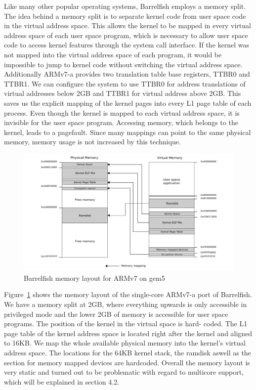\documentclass[a4paper,twoside]{report} %
\begin{document}
Like many other popular operating systems, Barrelfish employs a memory
split. The idea behind a memory split is to separate kernel code from
user space code in the virtual address space. This allows the kernel
to be mapped in every virtual address space of each user space
program, which is necessary to allow user space code to access kernel
features through the system call interface. If the kernel was not
mapped into the virtual address space of each program, it would be
impossible to jump to kernel code without switching the virtual
address space. Additionally ARMv7-a provides two translation table
base registers, TTBR0 and TTBR1. We can configure the system to use
TTBR0 for address translations of virtual addresses below 2GB and
TTBR1 for virtual address above 2GB. This saves us the explicit
mapping of the kernel pages into every L1 page table of each process.
Even though the kernel is mapped to each virtual address space, it is
invisible for the user space program. Accessing memory, which belongs
to the kernel, leads to a pagefault. Since many mappings can point to
the same physical memory, memory usage is not increased by this
technique.

\begin{figure}[htb]
  \centering
  \includegraphics[width=\linewidth]{figures/memory_layout.png}
  \caption{Barrelfish memory layout for ARMv7 on gem5}
  \label{fig:memory_layout}
\end{figure}

Figure~\ref{fig:memory_layout} shows the memory layout of the
single-core ARMv7-a port of Barrelfish. We have a memory split at 2GB,
where everything upwards is only accessible in privileged mode and the
lower 2GB of memory is accessible for user space programs. The
position of the kernel in the virtual space is hard- coded. The L1
page table of the kernel address space is located right after the
kernel and aligned to 16KB. We map the whole available physical memory
into the kernel’s virtual address space. The locations for the 64KB
kernel stack, the ramdisk aswell as the section for memory mapped
devices are hardcoded.  Overall the memory layout is very static and
turned out to be problematic with regard to multicore support, which
will be explained in section 4.2.
\end{document}
